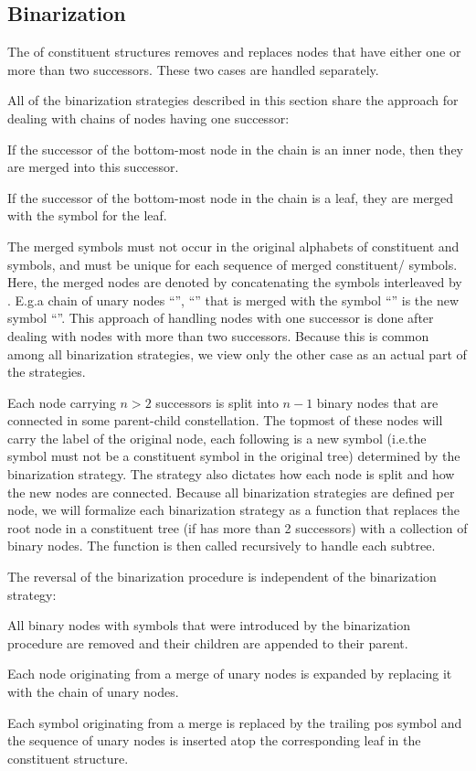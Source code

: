\documentclass[../../document.tex]{subfiles}
\begin{document}
    \subsection{Binarization}
    The  of constituent structures removes and replaces nodes that have either one or more than two successors.
    These two cases are handled separately.

    All of the binarization strategies described in this section share the approach for dealing with chains of nodes having one successor:
    \begin{inparaenum}
        \item If the successor of the bottom-most node in the chain is an inner node, then they are merged into this successor.
        \item If the successor of the bottom-most node in the chain is a leaf, they are merged with the  symbol for the leaf.
    \end{inparaenum}
    The merged symbols must not occur in the original alphabets of constituent and  symbols, and must be unique for each sequence of merged constituent/ symbols.
    Here, the merged nodes are denoted by concatenating the symbols interleaved by \cn{+}.
    E.g.\@ a chain of unary nodes ``'', ``'' that is merged with the  symbol ``'' is the new symbol ``''.
    This approach of handling nodes with one successor is done after dealing with nodes with more than two successors.
    Because this is common among all binarization strategies, we view only the other case as an actual part of the strategies.

    Each node carrying \( n > 2 \) successors is split into \( n-1 \) binary nodes that are connected in some parent-child constellation.
    The topmost of these nodes will carry the label of the original node, each following is a new symbol (i.e.\@ the symbol must not be a constituent symbol in the original tree) determined by the binarization strategy.
    The strategy also dictates how each node is split and how the new nodes are connected.
    Because all binarization strategies are defined per node, we will formalize each binarization strategy as a function that replaces the root node in a constituent tree (if has more than 2 successors) with a collection of binary nodes.
    The function is then called recursively to handle each subtree.

    The reversal of the binarization procedure is independent of the binarization strategy:
    \begin{compactenum}
        \item All binary nodes with symbols that were introduced by the binarization procedure are removed and their children are appended to their parent.
        \item Each node originating from a merge of unary nodes is expanded by replacing it with the chain of unary nodes.
        \item Each  symbol originating from a merge is replaced by the trailing pos symbol and the sequence of unary nodes is inserted atop the corresponding leaf in the constituent structure.
    \end{compactenum}
\end{document}
